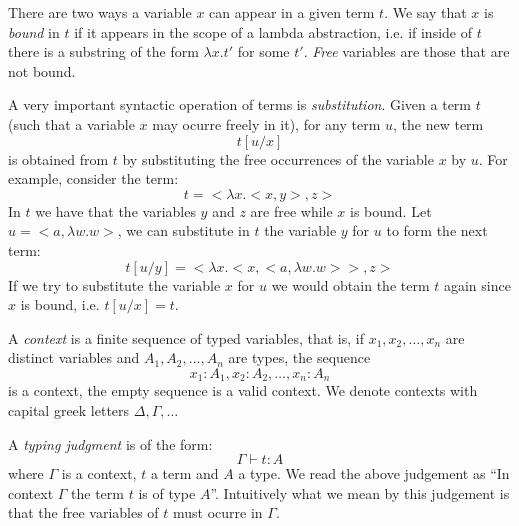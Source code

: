There are two ways a variable $x$ can appear in a given term $t$. We say that $x$ is \emph{bound} in $t$ if it appears in the scope of a lambda abstraction, i.e. if inside of $t$ there is a substring of the form $\lambda x.t'$ for some $t'$. \emph{Free} variables are those that are not bound.

A very important syntactic operation of terms is \emph{substitution}. Given a term $t$ (such that a variable $x$ may ocurre freely in it), for any term $u$, the new term
\[
t[u/x]
\]
is obtained from $t$ by substituting the free occurrences of the variable $x$ by $u$. For example, consider the term:
\[
t = <\lambda x.<x, y> , z>
\]
In $t$ we have that the variables $y$ and $z$ are free while $x$ is bound. Let $u = <a , \lambda w.w>$, we can substitute in $t$ the variable $y$ for $u$ to form the next term:
\[
t[u/y] = <\lambda x.<x, <a, \lambda w.w>> , z>
\]
If we try to substitute the variable $x$ for $u$ we would obtain the term $t$ again since $x$ is bound, i.e. $t[u/x] = t$.

A \emph{context} is a finite sequence of typed variables, that is, if $x_1, x_2, \dots , x_n$ are distinct variables and $A_1, A_2, \dots , A_n$ are types, the sequence 
\[
x_1 : A_1 , x_2 : A_2 , \dots , x_n : A_n
\]  
is a context, the empty sequence is a valid context. We denote contexts with capital greek letters $\Delta, \Gamma, \dots$

A \emph{typing judgment} is of the form:
\[
\Gamma \vdash t:A
\]
where $\Gamma$ is a context, $t$ a term and $A$ a type. We read the above judgement as ``In context $\Gamma$ the term $t$ is of type $A$''. Intuitively what we mean by this judgement is that the free variables of $t$ must ocurre in $\Gamma$.

